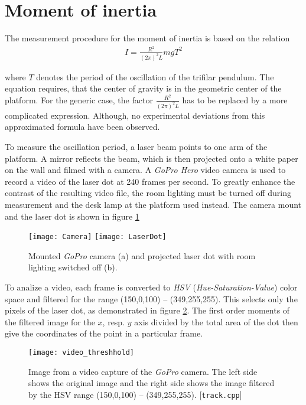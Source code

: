 \documentclass[journal]{IEEEtran}
\begin{document}
\section{Moment of inertia}

The measurement procedure for the moment of inertia is based on the relation \cite{report:ernest}
\begin{align}
	I = \frac{R^2}{(2\pi)^2 L} m g T^2
	\label{eq:I}
\end{align}

where $T$ denotes the period of the oscillation of the trifilar pendulum.
The equation requires, that the center of gravity is in the geometric center of the platform.
For the generic case, the factor $\frac{R^2}{(2\pi)^2 L}$ has to be replaced by a more complicated expression.
Although, no experimental deviations from this approximated formula have been observed.

To measure the oscillation period, a laser beam points to one arm of the platform.
A mirror reflects the beam, which is then projected onto a white paper on the wall and filmed with a camera. 
A \emph{GoPro Hero} video camera is used to record a video of the laser dot at 240 frames per second.
To greatly enhance the contrast of the resulting video file, the room lighting must be turned off during measurement and the desk lamp at the platform used instead.
The camera mount and the laser dot is shown in figure \ref{fig:LaserDot}

\begin{figure}
	\centering
	\texttt{[image: Camera]}
	\texttt{[image: LaserDot]}
	\caption{Mounted \emph{GoPro} camera (a) and projected laser dot with room lighting switched off (b).}
	\label{fig:LaserDot}
\end{figure}

To analize a video, each frame is converted to \emph{HSV} (\emph{Hue-Saturation-Value}) color space and filtered for the range (150,0,100) -- (349,255,255).
This selects only the pixels of the laser dot, as demonstrated in figure \ref{fig:VideoThreshhold}.
The first order moments of the filtered image for the $x$, resp. $y$ axis divided by the total area of the dot then give the coordinates of the point in a particular frame.

\begin{figure}
	\centering
	\texttt{[image: video\_threshhold]}
	\caption{Image from a video capture of the \emph{GoPro} camera. The left side shows the original image and the right side shows the image filtered by the HSV range (150,0,100) -- (349,255,255). [\texttt{track.cpp}]}
	\label{fig:VideoThreshhold}
\end{figure}
\end{document}
